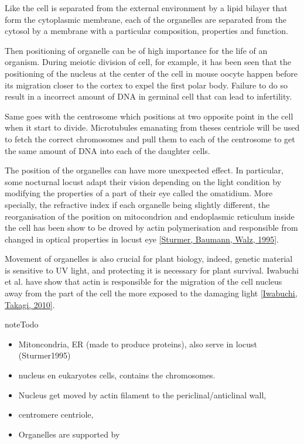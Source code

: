 \documentclass[A4paperpaper,11pt,english]{sphinxmanual}
\begin{document}
Like the cell is separated from the external environment by a lipid bilayer
that form the cytoplasmic membrane, each of the organelles are separated from
the cytosol by a membrane with a particular composition, properties and function.

Then positioning of organelle can be of high importance for the life of an
organism.  During meiotic division of cell, for example, it has been seen that
the positioning of the nucleus at the center of the cell in mouse oocyte happen
before its migration closer to the cortex to expel the first polar body.
Failure to do so result in a incorrect amount of DNA in germinal cell that can
lead to infertility.

Same goes with the centrosome which positions at two opposite point in the cell
when it start to divide. Microtubules emanating from theses centriole will be
used to fetch the correct chromosomes and pull them to each of the centrosome
to get the same amount of DNA into each of the daughter cells.

The position of the organelles can have more unexpected effect. In particular,
some nocturnal locust adapt their vision depending on the light condition by
modifying the properties of a part of their eye called the omatidium.  More
specially, the refractive index if each organelle being slightly different, the
reorganisation of the position on mitocondrion and endoplasmic reticulum inside
the cell has been show to be droved by actin polymerisation and responsible
from changed in optical properties in locust eye {\hyperref[bibitem:sturmer1995]{{[}Sturmer, Baumann, Walz,  1995{]}}}.

Movement of organelles is also crucial for plant biology, indeed, genetic
material is sensitive to UV light, and protecting it is necessary for plant
survival. Iwabuchi et al. have show that actin is responsible for the migration
of the cell nucleus away from the part of the cell the more exposed to the
damaging light {\hyperref[bibitem:iwabuchi2010]{{[}Iwabuchi, Takagi,  2010{]}}}.

\begin{notice}{note}{Todo}
\begin{itemize}
\item {} 
Mitoncondria, ER (made to produce proteins), also serve in locust (Sturmer1995)

\item {} 
nucleus en eukaryotes cells, contains the chromosomes.

\item {} 
Nucleus get moved by actin filament to the periclinal/anticlinal wall,

\item {} 
centromere centriole,

\item {} 
Organelles are supported by

\end{itemize}
\end{notice}
\end{document}
